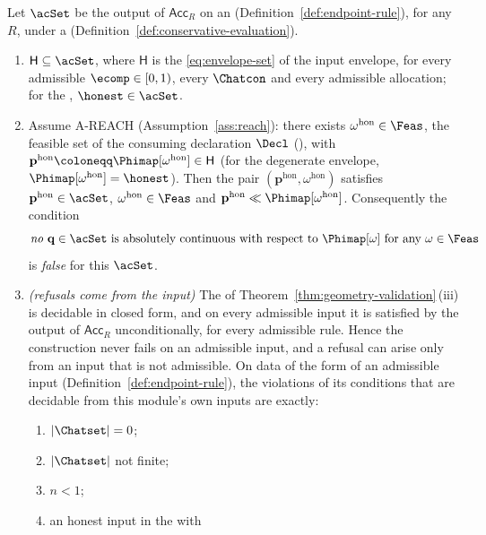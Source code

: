 \begin{theorem}\label{thm:honest-containment}
Let $\acSet$ be the output of $\mathsf{Acc}_R$ on an 
(Definition~\ref{def:endpoint-rule}), for any
 $R$, under a 
(Definition~\ref{def:conservative-evaluation}).
\begin{enumerate}[label=(\roman*),leftmargin=2.2em]
\item $\mathsf{H}\subseteq\acSet$, where $\mathsf{H}$ is the
 \eqref{eq:envelope-set} of the input envelope, for every
admissible $\ecomp\in[0,1)$, every $\Chatcon$ and every admissible
allocation; for the , $\honest\in\acSet$.
\item Assume A-REACH (Assumption~\ref{ass:reach}): there exists
$\omega^{\mathrm{hon}}\in\Feas$, the feasible set of the consuming
declaration $\Decl$ (), with
$\mathbf{p}^{\mathrm{hon}}\coloneqq\Phimap[\omega^{\mathrm{hon}}]\in\mathsf{H}$
(for the degenerate envelope, $\Phimap[\omega^{\mathrm{hon}}]=\honest$). Then
the pair $(\mathbf{p}^{\mathrm{hon}},\omega^{\mathrm{hon}})$ satisfies
$\mathbf{p}^{\mathrm{hon}}\in\acSet$, $\omega^{\mathrm{hon}}\in\Feas$ and
$\mathbf{p}^{\mathrm{hon}}\ll\Phimap[\omega^{\mathrm{hon}}]$. Consequently the
condition
\begin{equation}\label{eq:infeasible}
  \text{\emph{no} }\mathbf{q}\in\acSet\text{ is absolutely continuous with
  respect to }\Phimap[\omega]\text{ for any }\omega\in\Feas
\end{equation}
is \emph{false} for this $\acSet$.
\item \emph{(refusals come from the input)} The 
of Theorem~\ref{thm:geometry-validation}\,(iii) is decidable in closed form, and on every
admissible input it is satisfied by the output of $\mathsf{Acc}_R$
unconditionally, for every admissible rule. Hence the construction never
fails on an admissible input, and a refusal can arise only from an input that
is not admissible. On data of the form of an admissible input
(Definition~\ref{def:endpoint-rule}), the violations of its conditions that
are decidable from this module's own inputs are exactly:
\begin{enumerate}[label=(\arabic*),leftmargin=2.2em]
\item $|\Chatset|=0$;
\item $|\Chatset|$ not finite;
\item $n<1$;
\item an honest input in the  with

\end{enumerate}
\end{enumerate}
\end{theorem}
